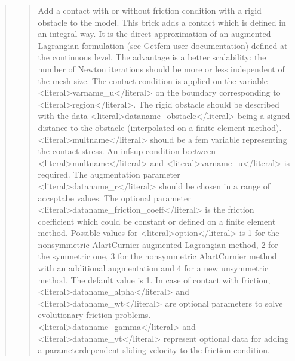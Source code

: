 \documentclass[a4paper,11pt,english]{sphinxmanual}
\begin{document}
\begin{quote}
\begin{quote}
\sphinxAtStartPar
Add a contact with or without friction condition with a rigid obstacle
to the model. This brick adds a contact which is defined
in an integral way. It is the direct approximation of an augmented
Lagrangian formulation (see Getfem user documentation) defined at the
continuous level. The advantage is a better scalability: the number of
Newton iterations should be more or less independent of the mesh size.
The contact condition is applied on the variable \textless{}literal\textgreater{}varname\_u\textless{}/literal\textgreater{}
on the boundary corresponding to \textless{}literal\textgreater{}region\textless{}/literal\textgreater{}. The rigid obstacle should
be described with the data \textless{}literal\textgreater{}dataname\_obstacle\textless{}/literal\textgreater{} being a signed distance to
the obstacle (interpolated on a finite element method).
\textless{}literal\textgreater{}multname\textless{}/literal\textgreater{} should be a fem variable representing the contact stress.
An inf\sphinxhyphen{}sup condition beetween \textless{}literal\textgreater{}multname\textless{}/literal\textgreater{} and \textless{}literal\textgreater{}varname\_u\textless{}/literal\textgreater{} is required.
The augmentation parameter \textless{}literal\textgreater{}dataname\_r\textless{}/literal\textgreater{} should be chosen in a
range of acceptabe values.
The optional parameter \textless{}literal\textgreater{}dataname\_friction\_coeff\textless{}/literal\textgreater{} is the friction
coefficient which could be constant or defined on a finite element method.
Possible values for \textless{}literal\textgreater{}option\textless{}/literal\textgreater{} is 1 for the non\sphinxhyphen{}symmetric Alart\sphinxhyphen{}Curnier
augmented Lagrangian method, 2 for the symmetric one, 3 for the
non\sphinxhyphen{}symmetric Alart\sphinxhyphen{}Curnier method with an additional augmentation
and 4 for a new unsymmetric method. The default value is 1.
In case of contact with friction, \textless{}literal\textgreater{}dataname\_alpha\textless{}/literal\textgreater{} and \textless{}literal\textgreater{}dataname\_wt\textless{}/literal\textgreater{}
are optional parameters to solve evolutionary friction problems.
\textless{}literal\textgreater{}dataname\_gamma\textless{}/literal\textgreater{} and \textless{}literal\textgreater{}dataname\_vt\textless{}/literal\textgreater{} represent optional data for adding
a parameter\sphinxhyphen{}dependent sliding velocity to the friction condition.
\end{quote}

\sphinxAtStartPar
{}
\begin{quote}


\end{quote}
\end{quote}
\end{document}
